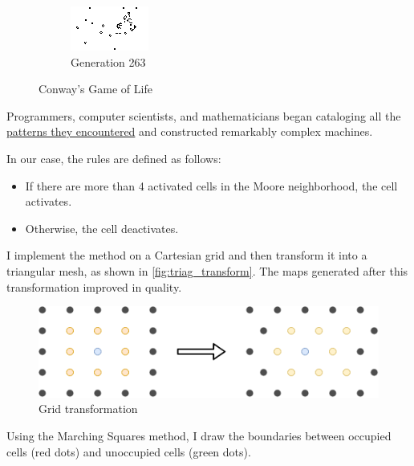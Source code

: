 \documentclass[../main.tex]{subfiles}
\begin{document}
\begin{figure}[H]
\begin{subfigure}{0.35\textwidth}
        \centering
        \includegraphics[width=\textwidth]{IMAGES/part2/CGOF_2.png}
        \caption{Generation 263}
    \end{subfigure}
    \caption{Conway's Game of Life}
    \label{fig:CGOF}
\end{figure}

Programmers, computer scientists, and mathematicians began cataloging all the \href{https://en.wikipedia.org/wiki/Conway's_Game_of_Life#Examples_of_patterns}{patterns they encountered} and constructed remarkably complex machines.

In our case, the rules are defined as follows:
\begin{itemize}  
    \item If there are more than 4 activated cells in the Moore neighborhood, the cell activates. 
    \item Otherwise, the cell deactivates. 
\end{itemize}

I implement the method on a Cartesian grid and then transform it into a triangular mesh, as shown in \autoref{fig:triag_transform}. The maps generated after this transformation improved in quality.

\begin{figure}[H]
	\centering
	\includegraphics[width=0.6\linewidth]{IMAGES/part2/grid_transform_map_generation.png}
	\caption{Grid transformation}
	\label{fig:triag_transform}
\end{figure}

Using the Marching Squares method, I draw the boundaries between occupied cells (red dots) and unoccupied cells (green dots).
\end{document}
